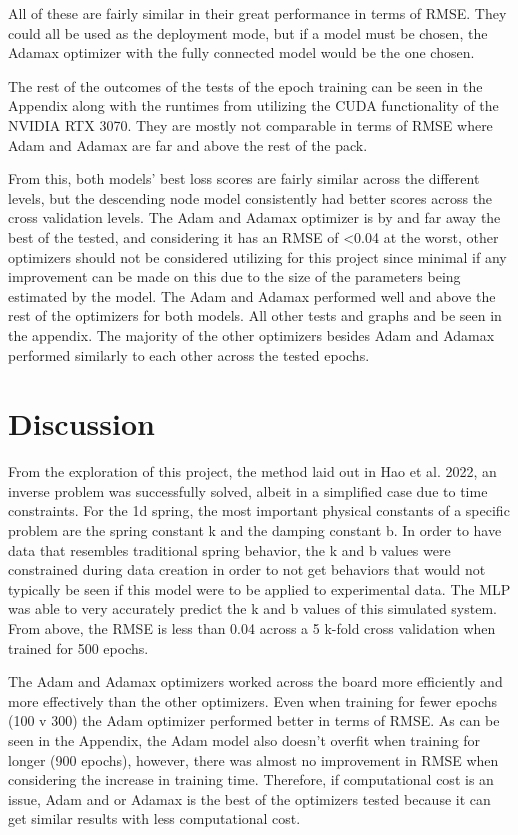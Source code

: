 \documentclass[12pt]{article}
\begin{document}
	All of these are fairly similar in their great performance in terms of RMSE. They could all be used as the deployment mode, but if a model must be chosen, the Adamax optimizer with the fully connected model would be the one chosen.

	The rest of the outcomes of the tests of the epoch training can be seen in the Appendix along with the runtimes from utilizing the CUDA functionality of the NVIDIA RTX 3070. They are mostly not comparable in terms of RMSE where Adam and Adamax are far and above the rest of the pack. 

	From this, both models' best loss scores are fairly similar across the different levels, but the descending node model consistently had better scores across the cross validation levels. The Adam and Adamax optimizer is by and far away the best of the tested, and considering it has an RMSE of <0.04  at the worst, other optimizers should not be considered utilizing for this project since minimal if any improvement can be made on this due to the size of the parameters being estimated by the model. The Adam and Adamax performed well and above the rest of the optimizers for both models. All other tests and graphs and be seen in the appendix. The majority of the other optimizers besides Adam and Adamax performed similarly to each other across the tested epochs.

\section*{Discussion}

	From the exploration of this project, the method laid out in Hao et al. 2022, an inverse problem was successfully solved, albeit in a simplified case due to time constraints. For the 1d spring, the most important physical constants of a specific problem are the spring constant k and the damping constant b. In order to have data that resembles traditional spring behavior, the k and b values were constrained during data creation in order to not get behaviors that would not typically be seen if this model were to be applied to experimental data. The MLP was able to very accurately predict the k and b values of this simulated system. From above, the RMSE is less than 0.04 across a 5 k-fold cross validation when trained for 500 epochs.

	The Adam and Adamax optimizers worked across the board more efficiently and more effectively than the other optimizers. Even when training for fewer epochs (100 v 300) the Adam optimizer performed better in terms of RMSE. As can be seen in the Appendix, the Adam model also doesn't overfit when training for longer (900 epochs), however, there was almost no improvement in RMSE when considering the increase in training time. Therefore, if computational cost is an issue, Adam and or Adamax is the best of the optimizers tested because it can get similar results with less computational cost. 
\end{document}
